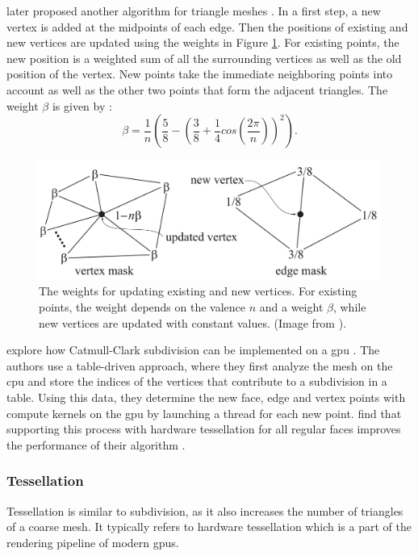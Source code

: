 \citeauthor{loop_subdivision} later proposed another algorithm for triangle meshes \cite{loop_subdivision}.
In a first step, a new vertex is added at the midpoints of each edge.
Then the positions of existing and new vertices are updated using the weights in Figure \ref{fig:loop_subdivision}.
For existing points, the new position is a weighted sum of all the surrounding vertices as well as the old position of the vertex.
New points take the immediate neighboring points into account as well as the other two points that form the adjacent triangles.
The weight $\beta$ is given by \cite{loop_subdivision}:
\begin{equation*}
    \beta = \frac{1}{n}(\frac{5}{8} - (\frac{3}{8} + \frac{1}{4}cos(\frac{2\pi}{n}))^2).
\end{equation*}
\begin{figure}[t]
    \centering
    \includegraphics[width=0.5\linewidth]{img/loop_subdivision.png}
    \caption[Weights in Loop subdivision]{The weights for updating existing and new vertices. For existing points, the weight depends on the valence $n$ and a weight $\beta$, while new vertices are updated with constant values. (Image from \cite{realtime}).}
    \label{fig:loop_subdivision}
\end{figure}

\citeauthor{niessner_subdivision} explore how Catmull-Clark subdivision can be implemented on a \ac{gpu} \cite{niessner_subdivision}.
The authors use a table-driven approach, where they first analyze the mesh on the \ac{cpu} and store the indices of the vertices that contribute to a subdivision in a table.
Using this data, they determine the new face, edge and vertex points with compute kernels on the \ac{gpu} by launching a thread for each new point.
\citeauthor{niessner_subdivision} find that supporting this process with hardware tessellation for all regular faces improves the performance of their algorithm \cite{niessner_subdivision}.


\subsubsection*{Tessellation}
Tessellation is similar to subdivision, as it also increases the number of triangles of a coarse mesh.
It typically refers to hardware tessellation which is a part of the rendering pipeline of modern \acp{gpu}.



